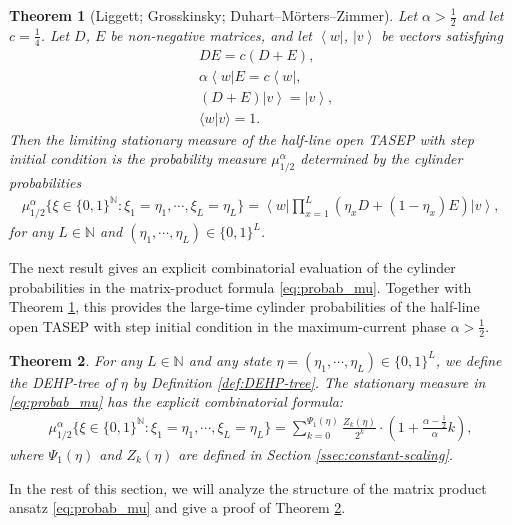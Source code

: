 \documentclass[12pt,a4paper]{amsart}
\newcommand{\bra}[1]{\left\langle #1\right|}
\newcommand{\ket}[1]{\left|#1\right\rangle}
\newtheorem{theorem}{Theorem} %
\theoremstyle{remark}
\numberwithin{equation}{section} \numberwithin{theorem}{section}
\newcommand{\braket}[2]{\langle #1 | #2 \rangle}
\begin{document}
\begin{theorem}[Liggett; Grosskinsky; Duhart--Mörters--Zimmer]
\label{thm:MPA}
Let $\alpha>\frac12$ and let $c=\frac14$. 
Let $D$, $E$ be non-negative matrices, and let $\bra{w}$, $\ket{v}$ be vectors satisfying
\begin{align}
\label{eq:stationary1}
&DE=c(D+E),\\
\label{eq:stationary2}
&\alpha \bra{w}E=c\bra{w},\\
\label{eq:stationary3}
&(D+E)\ket{v}=\ket{v},\\
\label{eq:stationary4}
&\braket{w}{v}=1.
\end{align}
Then the limiting stationary measure of the half-line open TASEP with step initial condition is the probability measure $\mu_{1/2}^{\alpha}$ determined by the cylinder probabilities
\begin{align}
\label{eq:probab_mu}
\mu_{1/2}^{\alpha}\{\xi \in \{0,1\}^{\mathbb{N}}: \xi_1=\eta_1, \cdots, \xi_L=\eta_L\}
=
\bra{w}\prod_{x=1}^{L}\left(\eta_{x}D+(1-\eta_x)E\right)\ket{v},
\end{align} 
for any $L \in \mathbb{N}$ and $(\eta_1,\cdots,\eta_L)\in\{0,1\}^{L}$.
\end{theorem}


The next result gives an explicit combinatorial evaluation of the cylinder probabilities in the matrix-product formula \eqref{eq:probab_mu}. 
Together with Theorem \ref{thm:MPA}, this provides the large-time cylinder probabilities of the half-line open TASEP with step initial condition in the maximum-current phase $\alpha>\frac12$.
\begin{theorem}
\label{thm:combinatorial}
For any $L\in\mathbb{N}$ and any state $\eta=(\eta_1,\cdots,\eta_L) \in \{0,1\}^{L}$, we define the DEHP-tree of $\eta$ by Definition \ref{def:DEHP-tree}. The stationary measure in \eqref{eq:probab_mu} has the explicit combinatorial formula:
\begin{align}
\label{eq:stationary}
\mu_{1/2}^{\alpha}\{\xi\in\{0,1\}^{\mathbb{N}}: \xi_1=\eta_1, \cdots, \xi_L=\eta_L\}=\sum_{k=0}^{\Psi_{1}(\eta)} \frac{Z_k(\eta)}{2^k} \cdot \left(1+\frac{\alpha-\frac12}{\alpha}k\right),
\end{align}
where $\Psi_{1}(\eta)$ and $Z_k(\eta)$ are defined in Section \ref{ssec:constant-scaling}.
\end{theorem}
In the rest of this section, we will analyze the structure of the matrix product ansatz \eqref{eq:probab_mu} and give a proof of Theorem \ref{thm:combinatorial}.
\end{document}
